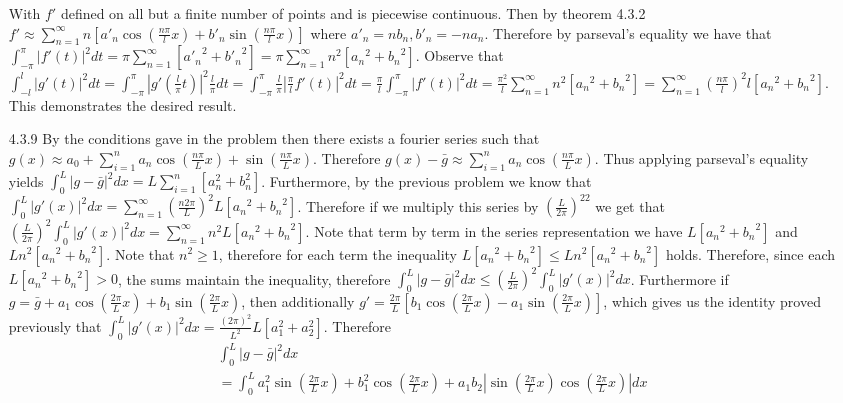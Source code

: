 \documentclass[12pt, letterpaper]{article}
\begin{document}
\begin{enumerate}
	 With 
	$f'$ defined on all but a finite number of points and is piecewise
	continuous.  Then by theorem 4.3.2 
	$f' \approx \sum_{n=1}^\infty n[a'_n \cos \left(\frac{n \pi}{l}x \right)+  b'_n \sin \left(\frac{n \pi}{l}x \right)]$ where 
	$a'_n = nb_n, b'_n = -na_n$.  Therefore by parseval's equality 
	we have that $\int_{-\pi}^\pi |f'(t)|^2 dt = 
	\pi \sum_{n=1}^\infty [{a'_n}^2 + {b'_n}^2] = \pi \sum_{n=1}^\infty n^2[{a_n}^2 + {b_n}^2]$.  Observe that 
	$\int_{-l}^l |g'(t)|^2 dt = \int_{-\pi}^\pi |g'(\frac{l}{\pi}t)|^2 
	\frac{l}{\pi}dt
	=\int_{-\pi}^\pi \frac{l}{\pi}|\frac{\pi}{l}f'(t)|^2 dt = 
	\frac{\pi}{l}\int_{-\pi}^\pi|f'(t)|^2 dt =
	\frac{\pi^2}{l} \sum_{n=1}^\infty n^2[{a_n}^2 + {b_n}^2]
	= \sum_{n=1}^\infty \left(\frac{n\pi}{l}\right)^2 l[{a_n}^2 + {b_n}^2].
	  $\\
	  This demonstrates the desired result.  
	\item[4.3.9] By the conditions gave in the problem then there 
	exists a fourier series such that 
	$g(x) \approx  a_0 +   \sum_{i=1}^n a_n \cos(\frac{n \pi}{L} x) + \sin(\frac{n \pi}{L} x) $.  Therefore $g(x) - \bar{g} \approx \sum_{i=1}^n a_n \cos(\frac{n \pi}{L} x)$.  Thus applying parseval's 
	equality yields 
	$\int_0^L |g - \bar{g}|^2 dx = L\sum_{i=1}^n [a_n^2 + b_n^2]$.  Furthermore, by the previous problem we know that   
	$\int_0^L |g'(x)|^2 dx = \sum_{n=1}^\infty \left(\frac{n2\pi}{L}\right)^2 L[{a_n}^2 + {b_n}^2]$.  Therefore if we multiply this series 
	by $\left(\frac{L}{2\pi}\right)^22$ we get that 
	$\left(\frac{L}{2\pi}\right)^2 \int_0^L |g'(x)|^2 dx
	= \sum_{n=1}^\infty  n^2L[{a_n}^2 + {b_n}^2]$.  Note 
	that term by term in the series representation we have 
	$L[{a_n}^2 + {b_n}^2]$ and $Ln^2[{a_n}^2 + {b_n}^2]$.  Note 
	that $n^2 \geq 1$, therefore for each term the inequality 
	$L[{a_n}^2 + {b_n}^2] \leq Ln^2[{a_n}^2 + {b_n}^2]$ holds.  
	Therefore, since each $L[{a_n}^2 + {b_n}^2] > 0$, the sums maintain
	the inequality, therefore 
	$\int_0^L |g - \bar{g}|^2 dx \leq \left(\frac{L}{2\pi}\right)^2 \int_0^L |g'(x)|^2 dx$.  Furthermore if $g = \bar{g} +
	 a_1 \cos\left(\frac{2 \pi}{L}x\right) + b_1 \sin\left(\frac{2 \pi}{L}x\right)$, then additionally $g' = \frac{2\pi}{L}[b_1 \cos\left(\frac{2 \pi}{L}x\right) - a_1 \sin\left(\frac{2 \pi}{L}x\right)]$, which gives us the identity proved previously 
	 that $\int_0^L |g'(x)|^2 dx = \frac{(2\pi)^2}{L^2} L[a_1^2 + a_2^2]$.  
	 Therefore 
	 \begin{align*}
	 &\int_0^L |g - \bar{g}|^2 dx\\ &= \int_0^L a_1^2 \sin\left(\frac{2 \pi}{L}x\right) + b_1^2 \cos\left(\frac{2 \pi}{L}x\right) + a_1 b_2 |\sin \left(\frac{2 \pi}{L}x\right)\cos \left(\frac{2 \pi}{L}x\right)|dx\\

\end{align*}
\end{enumerate}
\end{document}
